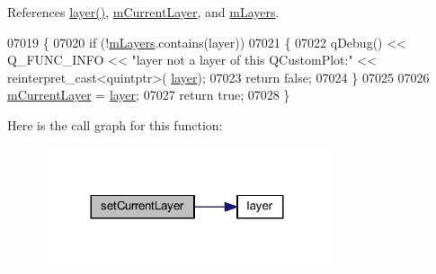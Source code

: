 References \hyperlink{a00116_ae576ada60c1133318e29348d43d3cf10}{layer()}, \hyperlink{a00116_source_l02139}{m\+Current\+Layer}, and \hyperlink{a00116_source_l02118}{m\+Layers}.


\begin{DoxyCode}
07019 \{
07020   \textcolor{keywordflow}{if} (!\hyperlink{a00116_ae46b0ffefe1087007ffb11398a18a20e}{mLayers}.contains(layer))
07021   \{
07022     qDebug() << Q\_FUNC\_INFO << \textcolor{stringliteral}{"layer not a layer of this QCustomPlot:"} << \textcolor{keyword}{reinterpret\_cast<}quintptr\textcolor{keyword}{>}(
      \hyperlink{a00116_ae576ada60c1133318e29348d43d3cf10}{layer});
07023     \textcolor{keywordflow}{return} \textcolor{keyword}{false};
07024   \}
07025   
07026   \hyperlink{a00116_ae9821179b860bf04af25882e881e5e09}{mCurrentLayer} = \hyperlink{a00116_ae576ada60c1133318e29348d43d3cf10}{layer};
07027   \textcolor{keywordflow}{return} \textcolor{keyword}{true};
07028 \}
\end{DoxyCode}


Here is the call graph for this function\+:
\nopagebreak
\begin{figure}[H]
\begin{center}
\leavevmode
\includegraphics[width=240pt]{d4/d3e/a00116_a23a4d3cadad1a0063c5fe19aac5659e6_cgraph}
\end{center}
\end{figure}


